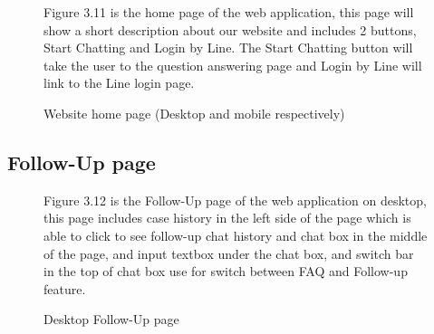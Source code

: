 \documentclass[12pt,oneside,openright,a4paper]{cpe-english-project}
\begin{document}
\begin{figure}[!h]
\begin{minipage}{.3\textwidth}
      \end{minipage}
      \caption{Website home page (Desktop and mobile respectively)}\label{fig:HomePage}
      \begin{flushleft}
        \qquad Figure 3.11 is the home page of the web application, this page will show a short description about our website and includes 2 buttons, Start Chatting and Login by Line. The Start Chatting button will take the user to the question answering page and Login by Line will link to the Line login page. \par
      \end{flushleft}
    \end{figure}

    \subsection{Follow-Up page}
      \begin{figure}[!h]
        \centering
        \caption{Desktop Follow-Up page}\label{fig:Desk_Follow}
        \begin{flushleft}
          \qquad Figure 3.12 is the Follow-Up page of the web application on desktop, this page includes case history in the left side of the page which is able to click to see follow-up chat history and chat box in the middle of the page, and input textbox under the chat box, and switch bar in the top of chat box use  for switch between FAQ and Follow-up feature. \par
        \end{flushleft}
      \end{figure}
\newpage
\end{document}
